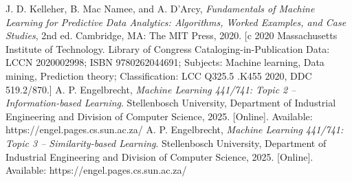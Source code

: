 \documentclass[conference]{IEEEtran}
\begin{document}
\begin{thebibliography}{00}
 J. D. Kelleher, B. Mac Namee, and A. D’Arcy, \textit{Fundamentals of Machine Learning for Predictive Data Analytics: Algorithms, Worked Examples, and Case Studies}, 2nd ed. Cambridge, MA: The MIT Press, 2020. [c 2020 Massachusetts Institute of Technology. Library of Congress Cataloging-in-Publication Data: LCCN 2020002998; ISBN 9780262044691; Subjects: Machine learning, Data mining, Prediction theory; Classification: LCC Q325.5 .K455 2020, DDC 519.2/870.]
 A. P. Engelbrecht, \textit{Machine Learning 441/741: Topic 2 -- Information-based Learning}. Stellenbosch University, Department of Industrial Engineering and Division of Computer Science, 2025. [Online]. Available: https://engel.pages.cs.sun.ac.za/
 A. P. Engelbrecht, \textit{Machine Learning 441/741: Topic 3 -- Similarity-based Learning}. Stellenbosch University, Department of Industrial Engineering and Division of Computer Science, 2025. [Online]. Available: https://engel.pages.cs.sun.ac.za/


\end{thebibliography}
\end{document}
